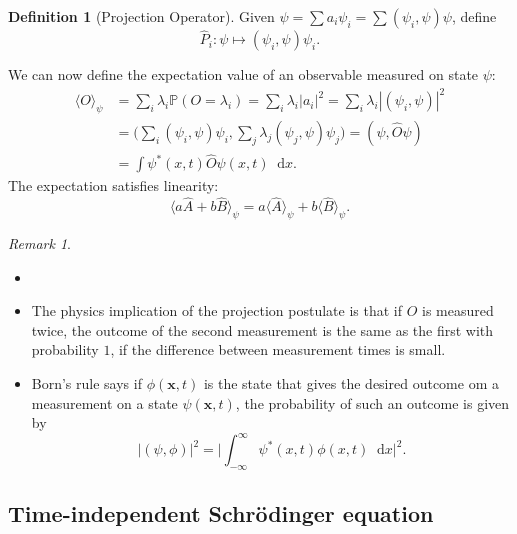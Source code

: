 \documentclass[12pt]{article}
\newcommand{\diff}{\mathop{}\!\mathrm{d}}
\theoremstyle{definition}
\newtheorem{definition}{Definition}[section]
\theoremstyle{remark}
\newtheorem*{remark}{Remark}
\begin{document}
\begin{definition}[Projection Operator]
	Given $\psi = \sum a_i \psi_i = \sum (\psi_i, \psi) \psi$, define
	\[
		\hat P_i : \psi \mapsto (\psi_i, \psi) \psi_i
	.\]
\end{definition}

We can now define the expectation value of an observable measured on state $\psi$:
\begin{align*}
	\langle O \rangle_{\psi} &= \sum_{i} \lambda_i \mathbb{P}(O = \lambda_i) = \sum_{i} \lambda_i |a_i|^2 = \sum_{i} \lambda_i |(\psi_i, \psi)|^2 \\
				 &= \Biggl( \sum_{i}(\psi_i, \psi)\psi_i, \sum_{j} \lambda_j(\psi_j, \psi) \psi_j \Biggr) = (\psi, \hat O \psi) \\
				 &= \int \psi^{\ast}(x, t) \hat O \psi(x, t) \diff x.
\end{align*}
The expectation satisfies linearity:
\[
	\langle a \hat A + b \hat B \rangle_{\psi} = a \langle \hat A \rangle_{\psi} + b \langle \hat B \rangle_{\psi}
.\]

\begin{remark}
	\begin{itemize}
		\item[]
		\item The physics implication of the projection postulate is that if $O$ is measured twice, the outcome of the second measurement is the same as the first with probability $1$, if the difference between measurement times is small.
		\item Born's rule says if $\phi(\mathbf{x}, t)$ is the state that gives the desired outcome om a measurement on a state $\psi(\mathbf{x}, t)$, the probability of such an outcome is given by
			\[
				|(\psi, \phi)|^2 = \Biggl| \int_{-\infty}^{\infty} \psi^{\ast}(x, t) \phi(x, t) \diff x \Biggr|^2
			.\]
	\end{itemize}
\end{remark}

\subsection{Time-independent Schr\"{o}dinger equation}%
\label{sub:time_independent_schr"_o_dinger_equation}
\end{document}
